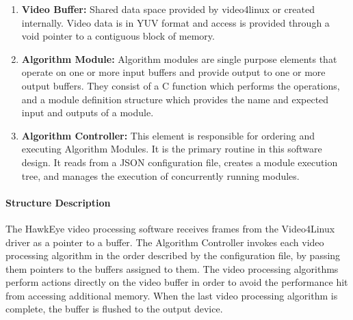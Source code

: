 	\begin{enumerate}[leftmargin=2cm,labelindent=2cm]
	\item \textbf{Video Buffer:}
	Shared data space provided by video4linux or created internally. Video data is in YUV format and access is provided through a void pointer to a 	contiguous block of memory.
	\item \textbf{Algorithm Module:} 
	Algorithm modules are single purpose elements that operate on one or more input buffers and provide output to one or more output buffers. They 	consist of a C function which performs the operations, and a module definition structure which provides the name and expected input and outputs 	of a module. 
	\item \textbf{Algorithm Controller:}
	This element is responsible for ordering and executing Algorithm Modules. It is the primary routine in this software design. It reads from a JSON 	configuration file, creates a module execution tree, and manages the execution of concurrently running modules.\\
	\end{enumerate}
	
	\paragraph{Structure Description}
	The HawkEye video processing software receives frames from the Video4Linux driver as a pointer to a buffer. The Algorithm Controller invokes each video processing algorithm in the order described by the configuration file, by passing them pointers to the buffers assigned to them. The video processing algorithms perform actions directly on the video buffer in order to avoid the performance hit from accessing additional memory. When the last video processing algorithm is complete, the buffer is flushed to the output device.\\
	

